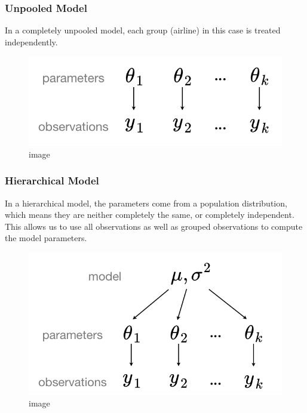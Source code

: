 \documentclass[11pt]{article}
\makeatletter
\def\maxwidth{\ifdim\Gin@nat@width>\linewidth\linewidth
    \else\Gin@nat@width\fi}
\let\Oldincludegraphics\includegraphics
\renewcommand{\includegraphics}[1]{\Oldincludegraphics[width=.8\maxwidth]{#1}}
\makeatother
\begin{document}
\hypertarget{unpooled-model}{%
\subsubsection{Unpooled Model}\label{unpooled-model}}

In a completely unpooled model, each group (airline) in this case is
treated independently.

\begin{figure}
\centering
\includegraphics{images/unpooled.png}
\caption{image}
\end{figure}

\hypertarget{hierarchical-model}{%
\subsubsection{Hierarchical Model}\label{hierarchical-model}}

In a hierarchical model, the parameters come from a population
distribution, which means they are neither completely the same, or
completely independent. This allows us to use all observations as well
as grouped observations to compute the model parameters.

\begin{figure}
\centering
\includegraphics{images/hierarchical.png}
\caption{image}
\end{figure}
\end{document}
